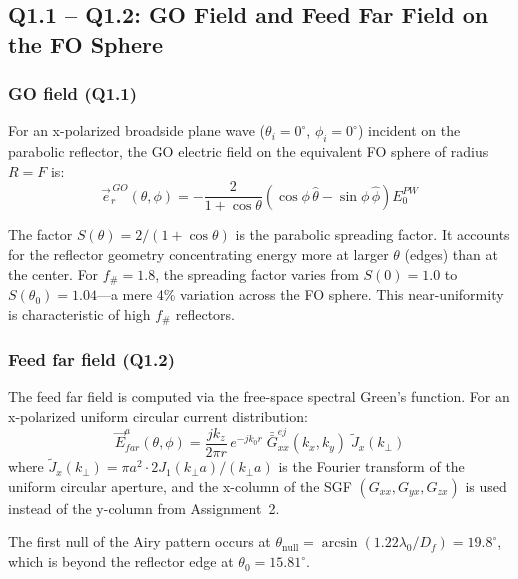\documentclass{article}
\begin{document}
\subsection{Q1.1 -- Q1.2: GO Field and Feed Far Field on the FO Sphere}

\subsubsection{GO field (Q1.1)}

For an x-polarized broadside plane wave ($\theta_i = 0^\circ$, $\phi_i = 0^\circ$) incident on the parabolic reflector, the GO electric field on the equivalent FO sphere of radius $R = F$ is:
\begin{equation}\label{eq:GO_field}
\vec{e}_r^{\,GO}(\theta,\phi) = -\frac{2}{1+\cos\theta}\left(\cos\phi\,\hat{\theta} - \sin\phi\,\hat{\phi}\right) E_0^{PW}
\end{equation}

The factor $S(\theta) = 2/(1+\cos\theta)$ is the parabolic spreading factor. It accounts for the reflector geometry concentrating energy more at larger $\theta$ (edges) than at the center. For $f_\# = 1.8$, the spreading factor varies from $S(0) = 1.0$ to $S(\theta_0) = 1.04$---a mere 4\% variation across the FO sphere. This near-uniformity is characteristic of high $f_\#$ reflectors.

\subsubsection{Feed far field (Q1.2)}

The feed far field is computed via the free-space spectral Green's function. For an x-polarized uniform circular current distribution:
\begin{equation}\label{eq:feed_ff}
\vec{E}^{a}_{far}(\theta,\phi) = \frac{jk_z}{2\pi r}\,e^{-jk_0 r}\;\bar{\bar{G}}^{ej}_{xx}(k_x,k_y)\;\widetilde{J}_x(k_\perp)
\end{equation}
where $\widetilde{J}_x(k_\perp) = \pi a^2 \cdot 2J_1(k_\perp a)/(k_\perp a)$ is the Fourier transform of the uniform circular aperture, and the x-column of the SGF $(G_{xx}, G_{yx}, G_{zx})$ is used instead of the y-column from Assignment~2.

The first null of the Airy pattern occurs at $\theta_{\text{null}} = \arcsin(1.22\lambda_0/D_f) = 19.8^\circ$, which is beyond the reflector edge at $\theta_0 = 15.81^\circ$.
\end{document}
